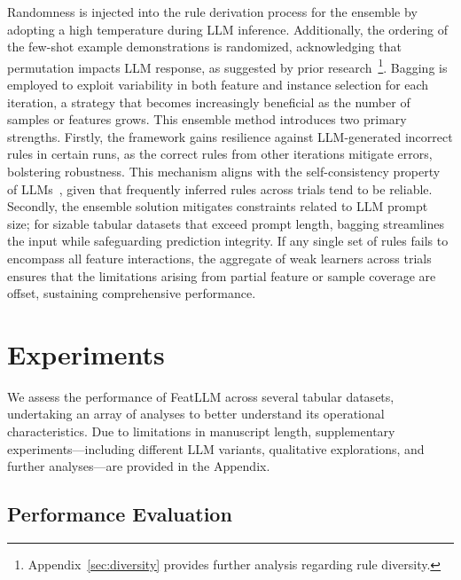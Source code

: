 Randomness is injected into the rule derivation process for the ensemble by adopting a high temperature during LLM inference. Additionally, the ordering of the few-shot example demonstrations is randomized, acknowledging that permutation impacts LLM response, as suggested by prior research~\cite{lu2022fantastically}\footnote{Appendix~\ref{sec:diversity} provides further analysis regarding rule diversity.}. Bagging is employed to exploit variability in both feature and instance selection for each iteration, a strategy that becomes increasingly beneficial as the number of samples or features grows. This ensemble method introduces two primary strengths. Firstly, the framework gains resilience against LLM-generated incorrect rules in certain runs, as the correct rules from other iterations mitigate errors, bolstering robustness. This mechanism aligns with the self-consistency property of LLMs~\cite{wang2022self}, given that frequently inferred rules across trials tend to be reliable. Secondly, the ensemble solution mitigates constraints related to LLM prompt size; for sizable tabular datasets that exceed prompt length, bagging streamlines the input while safeguarding prediction integrity. If any single set of rules fails to encompass all feature interactions, the aggregate of weak learners across trials ensures that the limitations arising from partial feature or sample coverage are offset, sustaining comprehensive performance.

\section{Experiments}
We assess the performance of \textsf{FeatLLM} across several tabular datasets, undertaking an array of analyses to better understand its operational characteristics. Due to limitations in manuscript length, supplementary experiments—including different LLM variants, qualitative explorations, and further analyses—are provided in the Appendix.

\subsection{Performance Evaluation}
